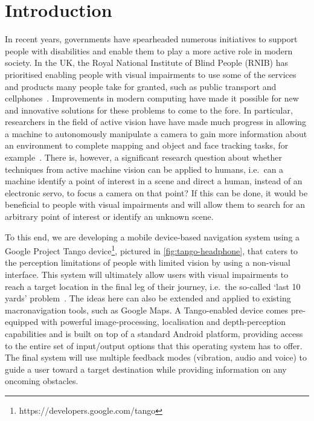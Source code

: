 \documentclass[sigconf, review=true, screen=true, anonymous=true]{acmart}
\begin{document}


\maketitle
\renewcommand{\shortauthors}{JC Lock et al.}

\section{Introduction}

In recent years, governments have spearheaded numerous initiatives to support people with disabilities and enable them to play a more active role in modern society.
In the UK, the Royal National Institute of Blind People (RNIB) has prioritised enabling people with visual impairments to use some of the services and products many people take for granted, such as public transport and cellphones~\cite{rnib-objectives}.
Improvements in modern computing have made it possible for new and innovative solutions for these problems to come to the fore.
In particular, researchers in the field of active vision have have made much progress in allowing a machine to autonomously manipulate a camera to gain more information about an environment to complete mapping and object and face tracking tasks, for example~\cite{bajcsy2018revisiting}.
There is, however, a significant research question about whether techniques from active machine vision can be applied to humans, i.e.\ can a machine identify a point of interest in a scene and direct a human, instead of an electronic servo, to focus a camera on that point? If this can be done, it would be beneficial to people with visual impairments and will allow them to search for an arbitrary point of interest or identify an unknown scene. 

To this end, we are developing a mobile device-based navigation system using a Google Project Tango device\footnote{https://developers.google.com/tango}, pictured in \cref{fig:tango-headphone}, that caters to the perception limitations of people with limited vision by using a non-visual interface.
This system will ultimately allow users with visual impairments to reach a target location in the final leg of their journey, i.e.\ the so-called `last 10 yards' problem~\cite{google2016blind,bellotto2013}. 
The ideas here can also be extended and applied to existing macronavigation tools, such as Google Maps.
A Tango-enabled device comes pre-equipped with powerful image-processing, localisation and depth-perception capabilities and is built on top of a standard Android platform, providing access to the entire set of input/output options that this operating system has to offer.
The final system will use multiple feedback modes (vibration, audio and voice) to guide a user toward a target destination while providing information on any oncoming obstacles.
\end{document}
